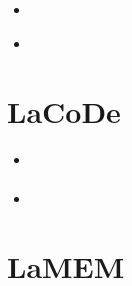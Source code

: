 \begin{small}
\begin{itemize}
\item[2024] \textcite{sptk24}
\item[2026] \textcite{deas26} 
\end{itemize}
\end{small}





\section{LaCoDe} 

\begin{small}
\begin{itemize}
\item[\twothousandnineteen] \textcite{demh19}
\item[\twothousandtwentytwo] \textcite{vacd22}
\end{itemize}
\end{small}


\section{LaMEM}

